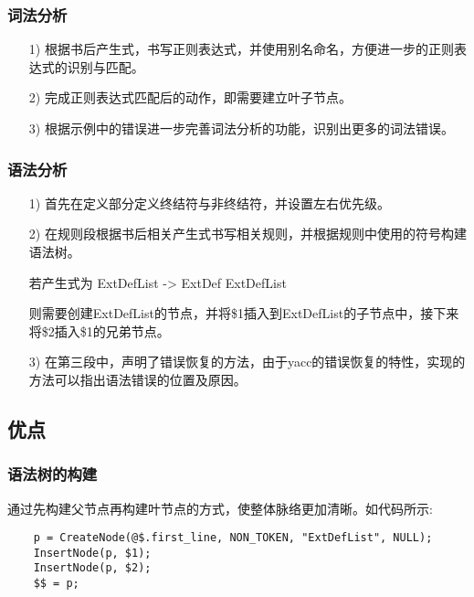\documentclass[UTF8]{ctexart}
\begin{document}
\subsubsection{词法分析}
\begin{itemize}
    \item [1)]
    根据书后产生式，书写正则表达式，并使用别名命名，方便进一步的正则表达式的识别与匹配。\par

    \item [2)]
    完成正则表达式匹配后的动作，即需要建立叶子节点。\par

    \item [3)]
    根据示例中的错误进一步完善词法分析的功能，识别出更多的词法错误。\par

\end{itemize}
\subsubsection{语法分析}
\begin{itemize}
    \item [1)]
    首先在定义部分定义终结符与非终结符，并设置左右优先级。\par

    \item [2)]
    在规则段根据书后相关产生式书写相关规则，并根据规则中使用的符号构建语法树。\par
    若产生式为
    ExtDefList -> ExtDef ExtDefList\par
    则需要创建ExtDefList的节点，并将\$1插入到ExtDefList的子节点中，接下来将\$2插入\$1的兄弟节点。
    \item [3)]
    在第三段中，声明了错误恢复的方法，由于yacc的错误恢复的特性，实现的方法可以指出语法错误的位置及原因。\par
\end{itemize}


\subsection{优点}
\subsubsection{语法树的构建}
通过先构建父节点再构建叶节点的方式，使整体脉络更加清晰。如代码所示:\par
\lstset{language=C}
\begin{lstlisting}
    p = CreateNode(@$.first_line, NON_TOKEN, "ExtDefList", NULL);  
    InsertNode(p, $1); 
    InsertNode(p, $2); 
    $$ = p;
\end{lstlisting} 
\end{document}

